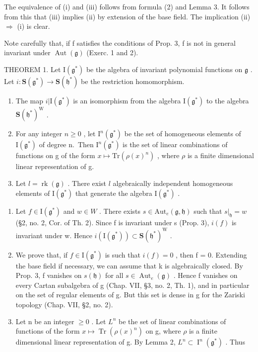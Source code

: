 The equivalence of (i) and (iii) follows from formula (2) and Lemma 3. It follows from this that (iii) implies (ii) by extension of the base field. The implication (ii) \(\Longrightarrow\) (i) is clear.

Note carefully that, if f satisfies the conditions of Prop. 3, f is not in general invariant under \(\operatorname{Aut}(\mathfrak{g})\) (Exerc. 1 and 2).

THEOREM 1. Let \(\mathrm{I}(\mathfrak{g}^*)\) be the algebra of invariant polynomial functions on \(\mathfrak{g}\) . Let \(i: \mathbf{S}(\mathfrak{g}^*) \to \mathbf{S}(\mathfrak{h}^*)\) be the restriction homomorphism.

\begin{enumerate}
\def\labelenumi{(\roman{enumi})}
\item
  The map \(i|\mathrm{I}(\mathfrak{g}^*)\) is an isomorphism from the algebra \(\mathrm{I}(\mathfrak{g}^*)\) to the algebra \(\mathbf{S}(\mathfrak{h}^*)^{\mathrm{W}}\) .
\item
  For any integer \(n \geq 0\) , let \(\mathrm{I}^{n}(\mathfrak{g}^{*})\) be the set of homogeneous elements of \(\mathrm{I}(\mathfrak{g}^{*})\) of degree n.~Then \(\mathrm{I}^{n}(\mathfrak{g}^{*})\) is the set of linear combinations of functions on g of the form \(x \mapsto \mathrm{Tr}(\rho(x)^{n})\) , where \(\rho\) is a finite dimensional linear representation of g.
\item
  Let \(l = \operatorname{rk}(\mathfrak{g})\) . There exist \(l\) algebraically independent homogeneous elements of \(\mathrm{I}(\mathfrak{g}^*)\) that generate the algebra \(\mathrm{I}(\mathfrak{g}^*)\) .
\end{enumerate}

\begin{enumerate}
\def\labelenumi{\alph{enumi})}
\item
  Let \(f \in \mathrm{I}(\mathfrak{g}^{*})\) and \(w \in W\) . There exists \(s \in \mathrm{Aut}_{e}(\mathfrak{g}, \mathfrak{h})\) such that \(s|_{\mathfrak{h}} = w\) (§2, no. 2, Cor. of Th. 2). Since f is invariant under s (Prop. 3), \(i(f)\) is invariant under w. Hence \(i(\mathrm{I}(\mathfrak{g}^{*})) \subset \mathbf{S}(\mathfrak{h}^{*})^{\mathrm{W}}\) .
\item
  We prove that, if \(f \in \mathrm{I}(\mathfrak{g}^{*})\) is such that \(i(f) = 0\) , then f = 0. Extending the base field if necessary, we can assume that k is algebraically closed. By Prop. 3, f vanishes on \(s(\mathfrak{h})\) for all \(s \in \operatorname{Aut}_{e}(\mathfrak{g})\) . Hence f vanishes on every Cartan subalgebra of g (Chap. VII, §3, no. 2, Th. 1), and in particular on the set of regular elements of g. But this set is dense in g for the Zariski topology (Chap. VII, §2, no. 2).
\item
  Let n be an integer \(\geq 0\) . Let \(L^{n}\) be the set of linear combinations of functions of the form \(x \mapsto \operatorname{Tr}(\rho(x)^{n})\) on g, where \(\rho\) is a finite dimensional linear representation of g. By Lemma 2, \(L^{n} \subset \operatorname{I}^{n}(\mathfrak{g}^{*})\) . Thus
\end{enumerate}

